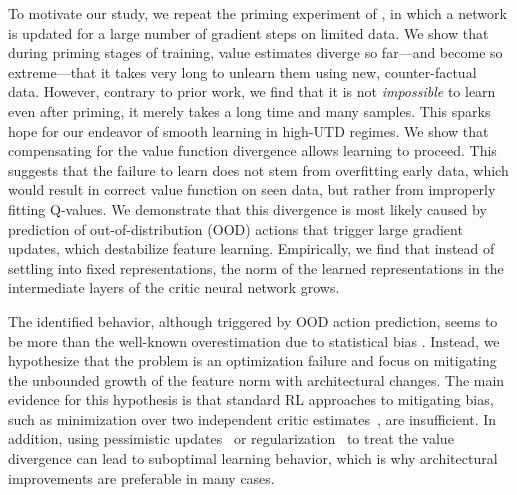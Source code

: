 To motivate our study, we repeat the priming experiment of \textcite{nikishin2022primacy}, in which a network is updated for a large number of gradient steps on limited data. We show that during priming stages of training, value estimates diverge so far---and become so extreme---that it takes very long to unlearn them using new, counter-factual 
data. However, contrary to prior work, we find that it is not \emph{impossible} to learn even after priming, it merely takes a long time and many samples. 
This sparks hope for our endeavor of smooth learning in high-UTD regimes.
We show that compensating for the value function divergence allows learning to proceed. 
This suggests that the failure to learn does not stem from overfitting early data, which would result in correct value function on seen data, but rather from improperly fitting Q-values. 
We demonstrate that this divergence is most likely caused by prediction of out-of-distribution (OOD) actions that trigger large gradient updates, which destabilize feature learning.
Empirically, we find that instead of settling into fixed representations, the norm of the learned representations in the intermediate layers of the critic neural network grows.

The identified behavior, although triggered by OOD action prediction, seems to be more than the well-known overestimation due to statistical bias \parencite{thrun1993issues}. 
Instead, we hypothesize that the problem is an optimization failure and focus on mitigating the unbounded growth of the feature norm with architectural changes.
The main evidence for this hypothesis is that standard RL approaches to mitigating bias, such as minimization over two independent critic estimates~\parencite{fujimoto2018addressing}, are insufficient. 
In addition, using pessimistic updates~\parencite{fujimoto2019bcq, fujimoto2021td3bc} or regularization~\parencite{krogh1991simple, srivastava14dropout} to treat the value divergence can lead to suboptimal learning behavior, which is why architectural improvements are preferable in many cases.


